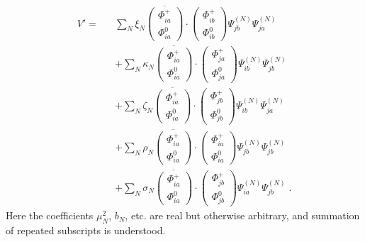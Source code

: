 \documentclass[12pt]{article}
\begin{document}
\begin{eqnarray}
V'=&&\sum_N \xi_N \overline{\left(\begin{array}{c} \Phi^+_{ia}\\ \Phi^0_{ia}\end{array}\right)}\cdot\left(\begin{array}{c} \Phi^+_{ib}\\ \Phi^0_{ib}\end{array}\right)
\Psi^{(N)}_{jb}\Psi^{(N)}_{ja}\nonumber\\&&
+\sum_N \kappa_N \overline{\left(\begin{array}{c} \Phi^+_{ia}\\ \Phi^0_{ia}\end{array}\right)}\cdot\left(\begin{array}{c} \Phi^+_{ja}\\ \Phi^0_{ja}\end{array}\right)
\Psi^{(N)}_{ib}\Psi^{(N)}_{jb}\nonumber\\&&
+\sum_N \zeta_N \overline{\left(\begin{array}{c} \Phi^+_{ia}\\ \Phi^0_{ia}\end{array}\right)}\cdot\left(\begin{array}{c} \Phi^+_{jb}\\ \Phi^0_{jb}\end{array}\right)
\Psi^{(N)}_{ib}\Psi^{(N)}_{ja}\nonumber\\&&
+\sum_N \rho_N \overline{\left(\begin{array}{c} \Phi^+_{ia}\\ \Phi^0_{ia}\end{array}\right)}\cdot\left(\begin{array}{c} \Phi^+_{ia}\\ \Phi^0_{ia}\end{array}\right)
\Psi^{(N)}_{jb}\Psi^{(N)}_{jb}\nonumber\\&&
+\sum_N \sigma_N \overline{\left(\begin{array}{c} \Phi^+_{ia}\\ \Phi^0_{ia}\end{array}\right)}\cdot\left(\begin{array}{c} \Phi^+_{jb}\\ \Phi^0_{jb}\end{array}\right)
\Psi^{(N)}_{ia}\Psi^{(N)}_{jb}\;.
\end{eqnarray}
    Here 
the coefficients $\mu_N^2$, $b_N$, etc. are real but otherwise arbitrary, and summation of repeated subscripts is understood.
\end{document}
